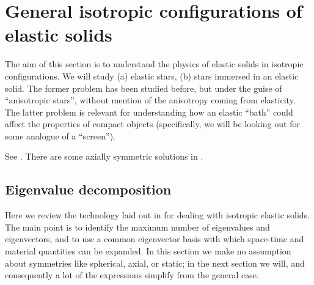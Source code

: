 \section{General isotropic configurations of elastic solids}
The aim of this section is to understand the physics of elastic solids in isotropic configurations. We will study (a) elastic stars, (b) stars immersed in an elastic solid. The former problem has been studied before, but under the guise of ``anisotropic stars'', without mention of the anisotropy coming from elasticity. The latter problem is relevant for understanding how an elastic ``bath'' could affect the properties of compact objects (specifically, we will be looking out for some analogue of a ``screen''). 

See \cite{Frauendiener:2007yx}. There are some axially symmetric solutions in \cite{GRG_giulio_1993, Brito:2014hra, 1742-6596-314-1-012028, brito_thesis}.

\subsection{Eigenvalue decomposition}
Here we review the technology laid out in \cite{Karlovini:2002fc, Andersson:2006ze, Brito:2009jj} for dealing with isotropic elastic solids. The main point is to identify the maximum number of eigenvalues and eigenvectors, and to use a common eigenvector basis with which space-time and  material quantities can be expanded. In this section we make no assumption about symmetries like  spherical, axial, or static; in the next section we will, and consequently a lot of the expressions simplify from the general case.

